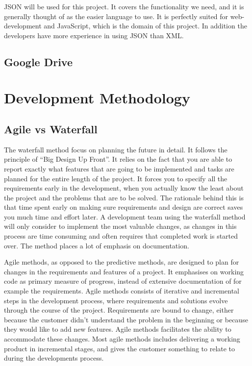 JSON will be used for this project. It covers the functionality we need, and it is generally thought of as the easier language to use. It is perfectly suited for web- development and JavaScript, which is the domain of this project. In addition the developers have more experience in using JSON than XML.

\subsection{Google Drive}

\section{Development Methodology}
\subsection{Agile vs Waterfall}
The waterfall method focus on planning the future in detail. It follows the principle of “Big Design Up Front”. It relies on the fact that you are able to report exactly what features that are going to be implemented and tasks are planned for the entire length of the project. It forces you to specify all the requirements early in the development, when you actually know the least about the project and the problems that are to be solved. The rationale behind this is that time spent early on making sure requirements and design are correct saves you much time and effort later. A development team using the waterfall method will only consider to implement the most valuable changes, as changes in this process are time consuming and often requires that completed work is started over. The method places a lot of emphasis on documentation. 

Agile methods, as opposed to the predictive methods, are designed to plan for changes in the requirements and features of a project. It emphasises on working code as primary measure of progress, instead of extensive documentation of for example the requirements. Agile methods consists of iterative and incremental steps in the development process, where requirements and solutions evolve through the course of the project. Requirements are bound to change, either because the customer didn't understand the problem in the beginning or because they would like to add new features. Agile methods facilitates the ability to accommodate these changes. Most agile methods includes delivering a working product in incremental stages, and gives the customer something to relate to during the developments process.


